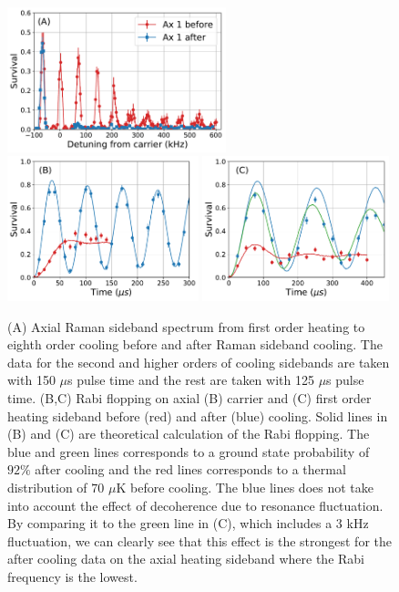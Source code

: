 \documentclass[aps,prl,twocolumn,groupedaddress]{revtex4-1}
\begin{document}
\begin{figure}
  \includegraphics[height=4.2cm]{imgs/spectrum_a1.pdf}
  \includegraphics[height=4.2cm]{imgs/rabi_flop_a1_0.pdf}
  \includegraphics[height=4.2cm]{imgs/rabi_flop_a1_p1.pdf}
  \caption{(A) Axial Raman sideband spectrum from first order heating to eighth order cooling
    before and after Raman sideband cooling.
    The data for the second and higher orders of cooling sidebands are taken with 150 $\mu$s
    pulse time and the rest are taken with 125 $\mu$s pulse time.
    (B,C) Rabi flopping on axial (B) carrier and (C) first order heating sideband
    before (red) and after (blue) cooling.
    Solid lines in (B) and (C) are theoretical calculation of the Rabi flopping.
    The blue and green lines corresponds to a ground state probability of $92\%$ after cooling and
    the red lines corresponds to a thermal distribution of $70$ $\mu$K before cooling.
    The blue lines does not take into account the effect of decoherence due to resonance
    fluctuation. By comparing it to the green line in (C), which includes a $3$ kHz fluctuation,
    we can clearly see that this effect is the strongest for the after cooling data on
    the axial heating sideband where the Rabi frequency is the lowest.
    \label{f-axial}}
\end{figure}
\end{document}
